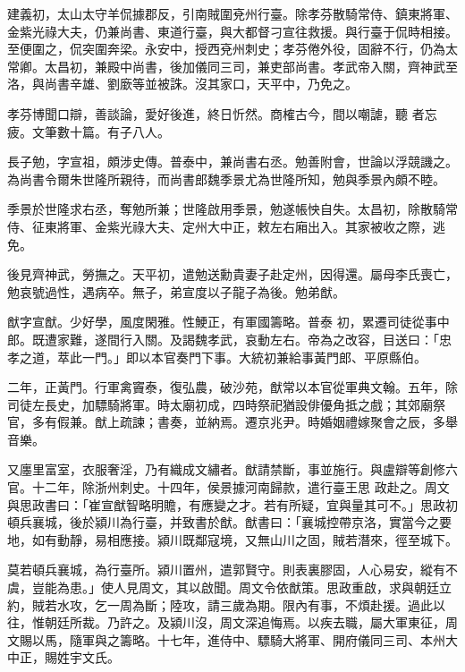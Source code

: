\begin{pinyinscope}
 建義初，太山太守羊侃據郡反，引南賊圍兗州行臺。除孝芬散騎常侍、鎮東將軍、金紫光祿大夫，仍兼尚書、東道行臺，與大都督刁宣往救援。與行臺于侃時相接。至便圍之，侃突圍奔梁。永安中，授西兗州刺史；孝芬倦外役，固辭不行，仍為太常卿。太昌初，兼殿中尚書，後加儀同三司，兼吏部尚書。孝武帝入關，齊神武至洛，與尚書辛雄、劉廞等並被誅。沒其家口，天平中，乃免之。



 孝芬博聞口辯，善談論，愛好後進，終日忻然。商榷古今，間以嘲謔，聽
 者忘疲。文筆數十篇。有子八人。



 長子勉，字宣祖，頗涉史傳。普泰中，兼尚書右丞。勉善附會，世論以浮競譏之。為尚書令爾朱世隆所親待，而尚書郎魏季景尤為世隆所知，勉與季景內頗不睦。



 季景於世隆求右丞，奪勉所兼；世隆啟用季景，勉遂帳怏自失。太昌初，除散騎常侍、征東將軍、金紫光祿大夫、定州大中正，敕左右廂出入。其家被收之際，逃免。



 後見齊神武，勞撫之。天平初，遣勉送勳貴妻子赴定州，因得還。屬母李氏喪亡，勉哀號過性，遇病卒。無子，弟宣度以子龍子為後。勉弟猷。



 猷字宣猷。少好學，風度閑雅。性鯁正，有軍國籌略。普泰
 初，累遷司徒從事中郎。既遭家難，遂間行入關。及謁魏孝武，哀動左右。帝為之改容，目送曰：「忠孝之道，萃此一門。」即以本官奏門下事。大統初兼給事黃門郎、平原縣伯。



 二年，正黃門。行軍禽竇泰，復弘農，破沙苑，猷常以本官從軍典文翰。五年，除司徒左長史，加驃騎將軍。時太廟初成，四時祭祀猶設俳優角抵之戲；其郊廟祭官，多有假兼。猷上疏諫；書奏，並納焉。遷京兆尹。時婚姻禮嫁聚會之辰，多舉音樂。



 又廛里富室，衣服奢淫，乃有織成文繡者。猷請禁斷，事並施行。與盧辯等創修六官。十二年，除浙州刺史。十四年，侯景據河南歸款，遣行臺王思
 政赴之。周文與思政書曰：「崔宣猷智略明贍，有應變之才。若有所疑，宜與量其可不。」思政初頓兵襄城，後於潁川為行臺，并致書於猷。猷書曰：「襄城控帶京洛，實當今之要地，如有動靜，易相應接。潁川既鄰寇境，又無山川之固，賊若潛來，徑至城下。



 莫若頓兵襄城，為行臺所。潁川置州，遣郭賢守。則表裏膠固，人心易安，縱有不虞，豈能為患。」使人見周文，其以啟聞。周文令依猷策。思政重啟，求與朝廷立約，賊若水攻，乞一周為斷；陸攻，請三歲為期。限內有事，不煩赴援。過此以往，惟朝廷所裁。乃許之。及潁川沒，周文深追悔焉。以疾去職，屬大軍東征，周
 文賜以馬，隨軍與之籌略。十七年，進侍中、驃騎大將軍、開府儀同三司、本州大中正，賜姓宇文氏。




\end{pinyinscope}
